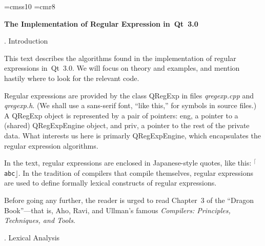 


\font\sf=cmss10
\font\eightrm=cmr8

\def\rx#1{{$^{\scriptscriptstyle\lceil}$\tt#1$\scriptscriptstyle\rfloor$}}

\def\<#1>{\leavevmode\hbox{$\langle$#1\/$\rangle$}}
\def\tok#1{\leavevmode\hbox{\eightrm\uppercase{#1}}}
\def\\{\char`\\}
\def\^{\char`\^}
\def\lex#1{\leavevmode\hbox{\tt#1}}
\let\is=\longrightarrow
\let\alt=\mid

\def\f#1{\strut\enskip#1\hfil\enskip}
\def\g#1{\strut\enskip\hfil#1\hfil\enskip}
\def\x{\phantom{+}}
\def\haha{$\hat a$}

\centerline{\bf The Implementation of Regular Expression in~Qt~3.0}
\smallskip

. Introduction

This text describes the algorithms found in the implementation of regular
expressions in~Qt~3.0. We will focus on theory and examples, and mention
hastily where to look for the relevant code.

Regular expressions are provided by the class {\sf QRegExp} in files {\it
qregexp.cpp} and {\it qregexp.h}. (We shall use a sans-serif font, ``{\sf like
this},'' for symbols in source files.) A {\sf QRegExp} object is represented by
a pair of pointers: {\sf eng}, a pointer to a (shared) {\sf QRegExpEngine}
object, and {\sf priv}, a pointer to the rest of the private data. What
interests us here is primarly {\sf QRegExpEngine}, which encapsulates the
regular expression algorithms.

In the text, regular expressions are enclosed in Japanese-style quotes, like
this: \rx{abc}. In the tradition of compilers that compile themselves, regular
expressions are used to define formally lexical constructs of regular
expressions.

Before going any further, the reader is urged to read Chapter~3 of the ``Dragon
Book''---that is, Aho, Ravi, and Ullman's famous {\sl Compilers: Principles,
Techniques, and Tools}.

. Lexical Analysis

